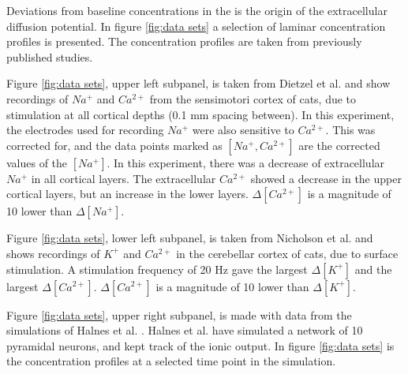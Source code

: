 \documentclass{article}
\begin{document}
Deviations from baseline concentrations in the is the origin of the extracellular diffusion potential. In figure \ref{fig:data sets} a selection of laminar concentration profiles is presented. The concentration profiles are taken from previously published studies. 

Figure \ref{fig:data sets}, upper left subpanel, is taken from Dietzel et al.\cite{Dietzel1982}  and show recordings of $Na^+$ and $Ca^{2+}$ from the sensimotori cortex of cats, due to stimulation at all cortical depths (0.1 mm spacing between).  In this experiment, the electrodes used for recording $Na^+$ were also sensitive to $Ca^{2+}$. This was corrected for, and the data points marked as $[Na^+, Ca^{2+}]$ are the corrected values of the $[Na^+]$. In this experiment, there was a decrease of extracellular $Na^+$ in all cortical layers. The extracellular $Ca^{2+}$ showed a decrease in the upper cortical layers, but an increase in the lower layers. $\Delta [Ca^{2+}]$ is  a magnitude of 10 lower than  $\Delta [Na^+]$.

Figure \ref{fig:data sets}, lower left subpanel, is taken from Nicholson et al.\cite{Nicholson1987} and shows recordings of $K^+$ and $Ca^{2+}$ in the cerebellar cortex of cats, due to surface stimulation. A stimulation frequency of 20 Hz gave the largest $\Delta [K^+]$ and the largest $\Delta [Ca^{2+}]$.   $\Delta [Ca^{2+}]$ is  a magnitude of 10 lower than  $\Delta [K^+]$.


Figure \ref{fig:data sets}, upper right subpanel, is made with data from the simulations of Halnes et al. \cite{Halnes2016}. Halnes et al. have simulated a network of 10 pyramidal neurons, and kept track of the ionic output. In figure \ref{fig:data sets} is the concentration profiles at a selected time point in the simulation.
\end{document}
